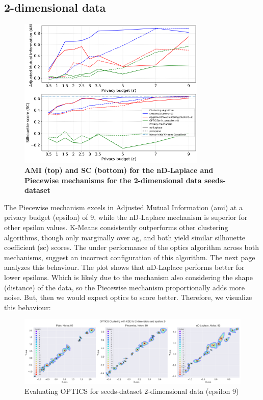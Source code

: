 \subsection{2-dimensional data}
\begin{figure}[H]
  \centering
  \caption{\textbf{AMI (top) and SC (bottom) for the nD-Laplace and Piecewise mechanisms for the 2-dimensional data seeds-dataset}}
  \includegraphics[width=0.8\textwidth]{Results/nd-laplace/nd-Laplace/seeds-dataset/ami-and-sc_2_dimensions.png}

  \label{fig:validation-seeds-dataset_comparison_2d-laplace}
\end{figure}
The Piecewise mechanism excels in Adjusted Mutual Information (\gls{ami}) at a privacy budget (epsilon) of 9, while the nD-Laplace mechanism is superior for other epsilon values. K-Means consistently outperforms other clustering algorithms, though only marginally over \gls{ag}, and both yield similar silhouette coefficient (\gls{sc}) scores. The under performance of the \gls{optics} algorithm across both mechanisms, suggest an incorrect configuration of this algorithm. The next page analyzes this behaviour.
\newpage
The plot shows that nD-Laplace performs better for lower epsilons. Which is likely due to the mechanism also considering the shape (distance) of the data, so the Piecewise mechanism proportionally adds more noise. But, then we would expect \gls{optics} to score better. Therefore, we visualize this behaviour:
\begin{figure}[H]
  \centering
  \includegraphics[width=1\linewidth]{Discussion/behaviour-2d-seeds-dataset&optics.png}
  \caption{Evaluating OPTICS for seeds-dataset 2-dimensional data (epsilon 9)}
  \label{fig:evaluate-optics-seeds-dataset-2d-9eps}
\end{figure}
